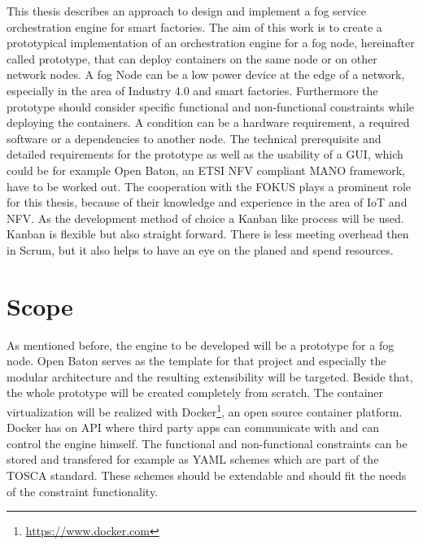 This thesis describes an approach to design and implement a fog service orchestration engine for smart factories.
The aim of this work is to create a prototypical implementation of an orchestration engine for a fog node, hereinafter called prototype, that can deploy containers on the same node or on other network nodes.
A fog Node can be a low power device at the edge of a network, especially in the area of Industry 4.0 and smart factories.
Furthermore the prototype should consider specific functional and non-functional constraints while deploying the containers.
A condition can be a hardware requirement, a required software or a dependencies to another node.
The technical prerequisite and detailed requirements for the prototype as well as the usability of a \ac{GUI}, which could be for example Open Baton, an \ac{ETSI} \ac{NFV} compliant \ac{MANO} framework, have to be worked out.
The cooperation with the \ac{FOKUS} plays a prominent role for this thesis, because of their knowledge and experience in the area of \ac{IoT} and \ac{NFV}.
As the development method of choice a Kanban like process will be used.
Kanban is flexible but also straight forward.
There is less meeting overhead then in Scrum, but it also helps to have an eye on the planed and spend resources.


\section{Scope}


As mentioned before, the engine to be developed will be a prototype for a fog node.
Open Baton serves as the template for that project and especially the modular architecture and the resulting extensibility will be targeted.
Beside that, the whole prototype will be created completely from scratch.
The container virtualization will be realized with Docker\footnote{\url{https://www.docker.com}}, an open source container platform.
Docker has on \ac{API} where third party apps can communicate with and can control the engine himself.
The functional and non-functional constraints can be stored and transfered for example as \ac{YAML} schemes which are part of the \ac{TOSCA} standard.
These schemes should be extendable and should fit the needs of the constraint functionality.

